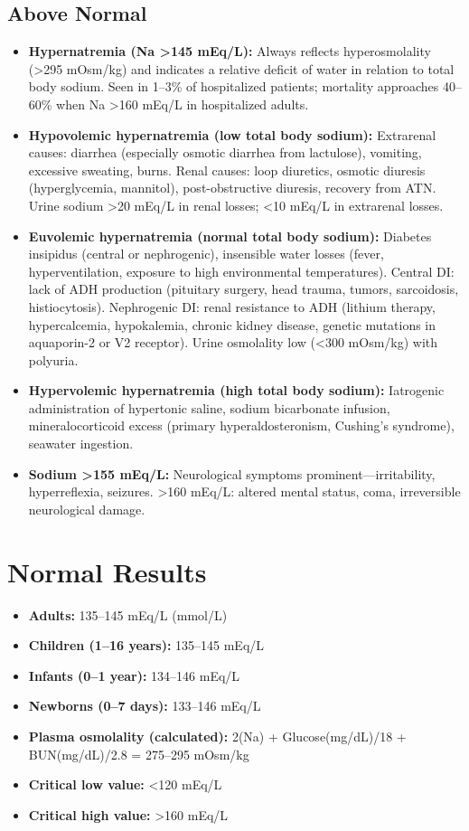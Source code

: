 \subsection*{Above Normal}
\begin{itemize}
  \item \textbf{Hypernatremia (Na >145 mEq/L):} Always reflects hyperosmolality (>295 mOsm/kg) and indicates a relative deficit of water in relation to total body sodium. Seen in 1--3\% of hospitalized patients; mortality approaches 40--60\% when Na >160 mEq/L in hospitalized adults.
  \item \textbf{Hypovolemic hypernatremia (low total body sodium):} Extrarenal causes: diarrhea (especially osmotic diarrhea from lactulose), vomiting, excessive sweating, burns. Renal causes: loop diuretics, osmotic diuresis (hyperglycemia, mannitol), post-obstructive diuresis, recovery from ATN. Urine sodium >20 mEq/L in renal losses; <10 mEq/L in extrarenal losses.
  \item \textbf{Euvolemic hypernatremia (normal total body sodium):} Diabetes insipidus (central or nephrogenic), insensible water losses (fever, hyperventilation, exposure to high environmental temperatures). Central DI: lack of ADH production (pituitary surgery, head trauma, tumors, sarcoidosis, histiocytosis). Nephrogenic DI: renal resistance to ADH (lithium therapy, hypercalcemia, hypokalemia, chronic kidney disease, genetic mutations in aquaporin-2 or V2 receptor). Urine osmolality low (<300 mOsm/kg) with polyuria.
  \item \textbf{Hypervolemic hypernatremia (high total body sodium):} Iatrogenic administration of hypertonic saline, sodium bicarbonate infusion, mineralocorticoid excess (primary hyperaldosteronism, Cushing's syndrome), seawater ingestion.
  \item \textbf{Sodium >155 mEq/L:} Neurological symptoms prominent---irritability, hyperreflexia, seizures. >160 mEq/L: altered mental status, coma, irreversible neurological damage.
\end{itemize}

\section*{Normal Results}
\begin{itemize}
  \item \textbf{Adults:} 135--145 mEq/L (mmol/L)
  \item \textbf{Children (1--16 years):} 135--145 mEq/L
  \item \textbf{Infants (0--1 year):} 134--146 mEq/L
  \item \textbf{Newborns (0--7 days):} 133--146 mEq/L
  \item \textbf{Plasma osmolality (calculated):} 2(Na) + Glucose(mg/dL)/18 + BUN(mg/dL)/2.8 = 275--295 mOsm/kg
  \item \textbf{Critical low value:} <120 mEq/L
  \item \textbf{Critical high value:} >160 mEq/L
\end{itemize}


